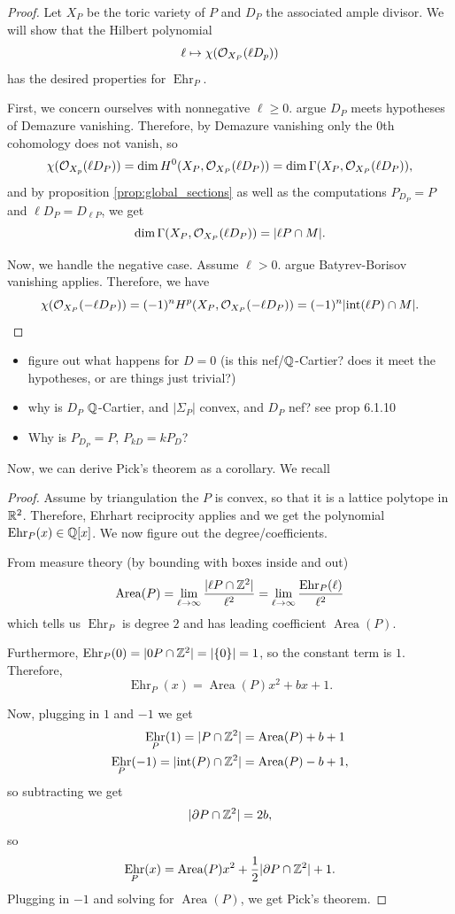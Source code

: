 \documentclass[12pt]{article}
\DeclareMathOperator{\Ehr}{Ehr}
\DeclareMathOperator{\Area}{Area}
\begin{document}
\begin{proof}
    Let $X_P$ be the toric variety of $P$ and $D_P$ the associated ample divisor. We will show that the Hilbert polynomial
    \[\ell \mapsto \chi(\mathcal{O}_{X_P}(\ell D_p))\]
    has the desired properties for $\Ehr_P$.
    
    First, we concern ourselves with nonnegative $\ell\geq 0$.{\color{red} argue $D_P$ meets hypotheses of Demazure vanishing}. Therefore, by Demazure vanishing only the 0th cohomology does not vanish, so
    \[\chi(\mathcal{O}_{X_p}(\ell D_P)) = \dim H^0(X_P, \mathcal{O}_{X_P}(\ell D_P)) = \dim \Gamma(X_P, \mathcal{O}_{X_P}(\ell D_P)),\]
    and by proposition \ref{prop:global_sections} as well as the computations $P_{D_P}=P$ and $\ell D_P = D_{\ell P}$, we get
    \[\dim \Gamma(X_P, \mathcal{O}_{X_P}(\ell D_P)) = |\ell P \cap M|.\]

    Now, we handle the negative case. Assume $\ell > 0$. {\color{red} argue Batyrev-Borisov vanishing applies}. Therefore, we have
    \[\chi(\mathcal{O}_{X_P}(-\ell D_P)) = (-1)^n H^p(X_P, \mathcal{O}_{X_P}(-\ell D_P)) = (-1)^n |\mathrm{int}(\ell P) \cap M|.\]
\end{proof}

{\color{red}\begin{itemize}
    \item figure out what happens for $D=0$ (is this nef/$\mathbb{Q}$-Cartier? does it meet the hypotheses, or are things just trivial?)
    \item why is $D_P$ $\mathbb{Q}$-Cartier, and $|\Sigma_P|$ convex, and $D_P$ nef?  see prop 6.1.10
    \item Why is $P_{D_P} = P$, $P_{kD} = kP_D$?
\end{itemize}}

Now, we can derive Pick's theorem as a corollary. We recall
\pick*

\begin{proof}
    Assume by triangulation the $P$ is convex, so that it is a lattice polytope in $\mathbb{R}^2$. Therefore, Ehrhart reciprocity applies and we get the polynomial $\Ehr_P(x)\in \Q[x]$. We now figure out the degree/coefficients.
    
    From measure theory (by bounding with boxes inside and out)
    \[\Area(P) = \lim_{\ell\to \infty} \frac{|\ell P \cap \Z^2|}{\ell^2} = \lim_{\ell\to\infty} \frac{\Ehr_P(\ell)}{\ell^2}\]
    which tells us $\Ehr_P$ is degree $2$ and has leading coefficient $\Area(P)$.

    Furthermore, $\Ehr_P(0) = |0P\cap \Z^2| = |\{0\}|=1$, so the constant term is $1$. Therefore,
    \[\Ehr_P(x) = \Area(P)x^2 + bx + 1.\]

    Now, plugging in $1$ and $-1$ we get
    \begin{align*}
        \Ehr_P(1) = |P\cap \Z^2| &= \Area(P) + b + 1\\
        \Ehr_P(-1) = |\mathrm{int}(P) \cap \Z^2| &= \Area(P) - b + 1,
    \end{align*}
    so subtracting we get
    \[|\partial P \cap \mathbb{Z}^2| = 2b,\]
    so
    \[\Ehr_P(x) = \Area(P)x^2 + \frac{1}{2}|\partial P \cap \Z^2| + 1.\]
    Plugging in $-1$ and solving for $\Area(P)$, we get Pick's theorem.
\end{proof}


\nocite{*} %
\end{document}
